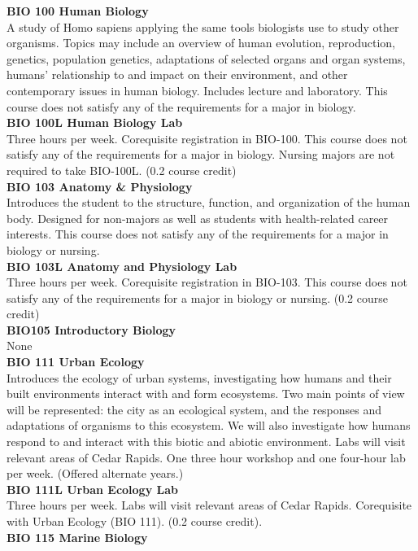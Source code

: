 \documentclass[
  letterpaper,
]{scrbook}
\begin{document}
\textbf{BIO 100 Human Biology}\\
A study of Homo sapiens applying the same tools biologists use to study
other organisms. Topics may include an overview of human evolution,
reproduction, genetics, population genetics, adaptations of selected
organs and organ systems, humans' relationship to and impact on their
environment, and other contemporary issues in human biology. Includes
lecture and laboratory. This course does not satisfy any of the
requirements for a major in biology.\\
\textbf{BIO 100L Human Biology Lab}\\
Three hours per week. Corequisite registration in BIO-100. This course
does not satisfy any of the requirements for a major in biology. Nursing
majors are not required to take BIO-100L. (0.2 course credit)\\
\textbf{BIO 103 Anatomy \& Physiology}\\
Introduces the student to the structure, function, and organization of
the human body. Designed for non-majors as well as students with
health-related career interests. This course does not satisfy any of the
requirements for a major in biology or nursing.\\
\textbf{BIO 103L Anatomy and Physiology Lab}\\
Three hours per week. Corequisite registration in BIO-103. This course
does not satisfy any of the requirements for a major in biology or
nursing. (0.2 course credit)\\
\textbf{BIO105 Introductory Biology}\\
None\\
\textbf{BIO 111 Urban Ecology}\\
Introduces the ecology of urban systems, investigating how humans and
their built environments interact with and form ecosystems. Two main
points of view will be represented: the city as an ecological system,
and the responses and adaptations of organisms to this ecosystem. We
will also investigate how humans respond to and interact with this
biotic and abiotic environment. Labs will visit relevant areas of Cedar
Rapids. One three hour workshop and one four-hour lab per week. (Offered
alternate years.)\\
\textbf{BIO 111L Urban Ecology Lab}\\
Three hours per week. Labs will visit relevant areas of Cedar Rapids.
Corequisite with Urban Ecology (BIO 111). (0.2 course credit).\\
\textbf{BIO 115 Marine Biology}\\
\end{document}
